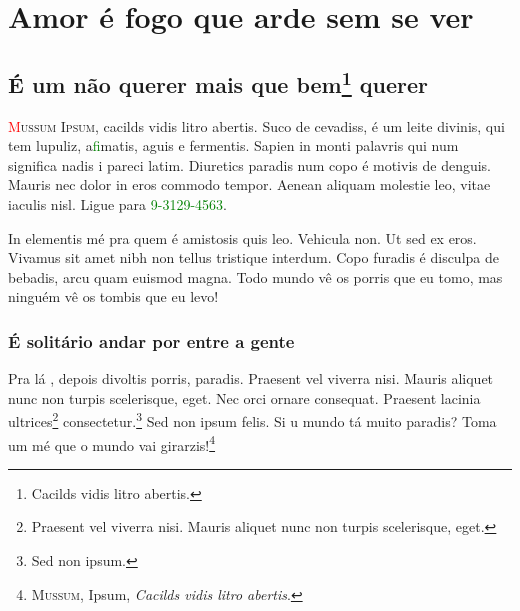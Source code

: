 
\part{Amor é fogo que arde sem se ver}

\chapter{É um não querer mais que bem\footnote{Cacilds vidis litro abertis.} querer}

\newcommand{\pacote}[1]{\marginnote{\tiny\alltt{#1}}}


\pacote{edlab-extra}
\begin{epigraphs} 
\end{epigraphs}

\pacote{lettrine.sty}
\lettrine[realheight]{\textcolor{red}{M}}{ussum Ipsum}, cacilds vidis litro abertis. Suco de cevadiss, é um leite
divinis, qui tem lupuliz, a\textcolor{green}{fi}matis, aguis e fermentis. Sapien in monti palavris
qui num significa nadis i pareci latim.  Diuretics paradis num copo é motivis
de denguis. Mauris nec dolor in eros commodo tempor. Aenean aliquam molestie
leo, vitae iaculis nisl. Ligue para \textcolor{green}{9-3129-4563}.


In elementis mé pra quem é amistosis quis leo. Vehicula non. Ut sed ex eros.
Vivamus sit amet nibh non tellus tristique interdum. Copo furadis é disculpa de
bebadis, arcu quam euismod magna. Todo mundo vê os porris que eu tomo, mas
ninguém vê os tombis que eu levo!

\section{É solitário andar por entre a gente}


Pra lá , depois divoltis porris, paradis. Praesent vel viverra nisi. Mauris
aliquet nunc non turpis scelerisque, eget. Nec orci ornare consequat. Praesent
lacinia ultrices\footnote{Praesent vel viverra nisi. Mauris
aliquet nunc non turpis scelerisque, eget.} consectetur.\footnote{Sed non ipsum.} Sed non ipsum felis. Si u mundo tá muito paradis?
Toma um mé que o mundo vai girarzis!\footnote{\textsc{Mussum}, Ipsum,
\textit{Cacilds vidis litro abertis}.}




